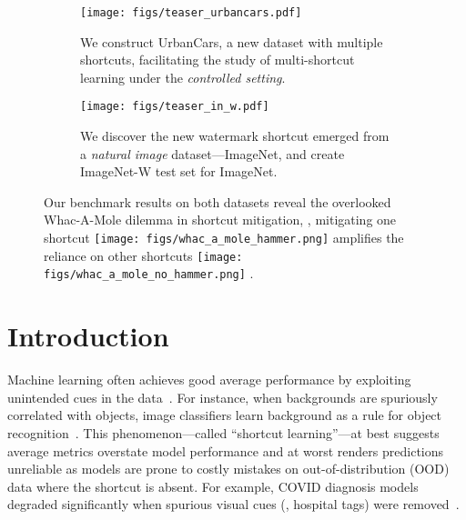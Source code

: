\documentclass[10pt,twocolumn,letterpaper]{article}
\DeclareRobustCommand{\molehammer}{\begingroup\normalfont
  \texttt{[image: figs/whac\_a\_mole\_hammer.png]}\endgroup
}
\DeclareRobustCommand{\molenohammer}{\begingroup\normalfont
  \texttt{[image: figs/whac\_a\_mole\_no\_hammer.png]}\endgroup
}
\begin{document}
\begin{figure*}
\centering
\begin{subfigure}[b]{.475\textwidth}
  \centering
  \texttt{[image: figs/teaser\_urbancars.pdf]}
  \caption{We construct UrbanCars, a new dataset with multiple shortcuts, facilitating the study of multi-shortcut learning under the \emph{controlled setting}.}
  \label{fig:teaser_urbancars}
\end{subfigure}\hfill
\begin{subfigure}[b]{.475\textwidth}
  \centering
  \texttt{[image: figs/teaser\_in\_w.pdf]}
  \caption{We discover the new watermark shortcut emerged from a \emph{natural image} dataset---ImageNet, and create ImageNet-W test set for ImageNet.}
  \label{fig:teaser_in_w}
\end{subfigure}
\caption{Our benchmark results on both datasets reveal the overlooked Whac-A-Mole dilemma in shortcut mitigation, \ie, mitigating one shortcut \molehammer{} amplifies the reliance on other shortcuts \molenohammer.}
\vspace{-6mm}
\end{figure*}

\section{Introduction}
Machine learning often achieves good average performance by exploiting unintended cues in the data~\cite{geirhos2020NatMachIntellShortcut}. For instance, when backgrounds are spuriously correlated with objects, image classifiers learn background as a rule for object recognition~\cite{xiao2021Int.Conf.Learn.Represent.Noise}.
This phenomenon---called ``shortcut learning''---at best suggests average metrics overstate model performance and at worst renders predictions unreliable as models are prone to costly mistakes on out-of-distribution (OOD) data where the shortcut is absent.
For example, COVID diagnosis models degraded significantly when spurious visual cues (\eg, hospital tags) were removed~\cite{degrave2021NatMachIntellAI}.
\end{document}
